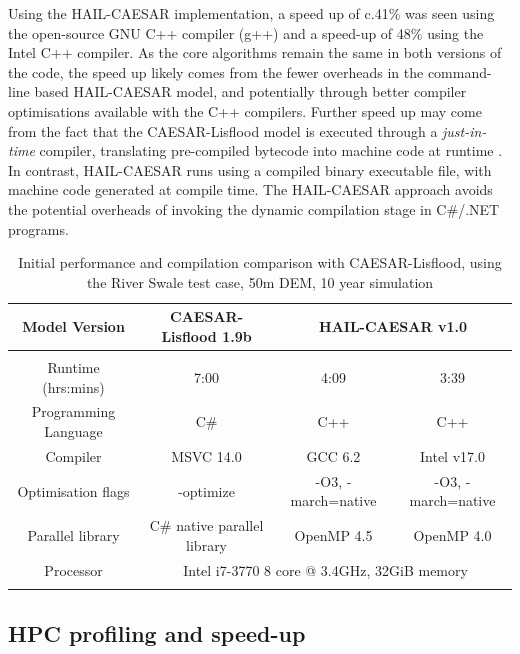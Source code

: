 Using the HAIL-CAESAR implementation, a speed up of c.41\% was seen using the open-source GNU C++ compiler (g++) and a speed-up of 48\% using the Intel C++ compiler. As the core algorithms remain the same in both versions of the code, the speed up likely comes from the fewer overheads in the command-line based HAIL-CAESAR model, and potentially through better compiler optimisations available with the C++ compilers. Further speed up may come from the fact that the CAESAR-Lisflood model is executed through a \textit{just-in-time} compiler, translating pre-compiled bytecode into machine code at runtime \citep{aycock2003brief}. In contrast, HAIL-CAESAR runs using a compiled binary executable file, with machine code generated at compile time. The HAIL-CAESAR approach avoids the potential overheads of invoking the dynamic compilation stage in C\#/.NET programs.

\begin{table}


\resizebox{\textwidth}{!}
{%
\begin{tabular}{cccc}
Model Version & \textbf{CAESAR-Lisflood 1.9b} & \multicolumn{2}{c}{\textbf{HAIL-CAESAR v1.0}} \\
\hline \\
Runtime (hrs:mins) & 7:00 & 4:09 & 3:39 \\
Programming Language & C\# & C++ & C++ \\
Compiler & MSVC 14.0 & GCC 6.2 & Intel v17.0 \\
Optimisation flags & -optimize & -O3, -march=native & -O3, -march=native \\
Parallel library & C\# native parallel library & OpenMP 4.5 & OpenMP 4.0 \\
Processor & \multicolumn{3}{c}{Intel i7-3770 8 core @ 3.4GHz, 32GiB memory} \\
\hline \\
\end{tabular} 
}
\caption{Initial performance and compilation comparison with CAESAR-Lisflood, using the River Swale test case, 50m DEM, 10 year simulation} 
\label{versus_CL}
\end{table}

\subsection{HPC profiling and speed-up}

